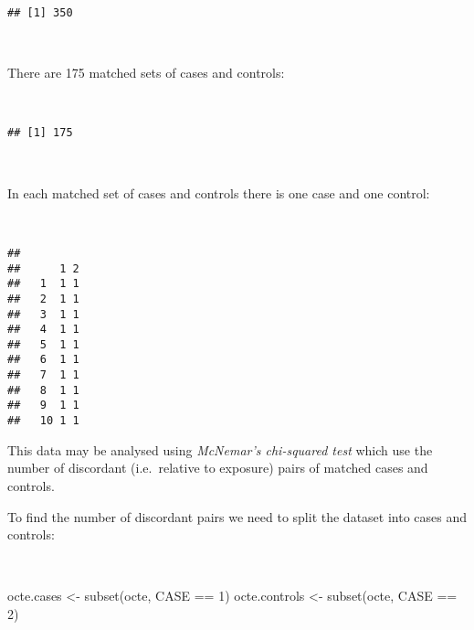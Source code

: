 \documentclass[
  12pt,
  a4paper]{book}
\newenvironment{Shaded}{\begin{snugshade}}{\end{snugshade}}
\newcommand{\DecValTok}[1]{\textcolor[rgb]{0.00,0.00,0.81}{#1}}
\newcommand{\FunctionTok}[1]{\textcolor[rgb]{0.00,0.00,0.00}{#1}}
\newcommand{\NormalTok}[1]{#1}
\newcommand{\OtherTok}[1]{\textcolor[rgb]{0.56,0.35,0.01}{#1}}
\newcommand{\SpecialCharTok}[1]{\textcolor[rgb]{0.00,0.00,0.00}{#1}}
\begin{document}
\begin{verbatim}
## [1] 350
\end{verbatim}

~

There are 175 matched sets of cases and controls:

~

\begin{Shaded}
\end{Shaded}

\begin{verbatim}
## [1] 175
\end{verbatim}

~

In each matched set of cases and controls there is one case and one control:

~

\begin{Shaded}
\end{Shaded}

\begin{verbatim}
##     
##      1 2
##   1  1 1
##   2  1 1
##   3  1 1
##   4  1 1
##   5  1 1
##   6  1 1
##   7  1 1
##   8  1 1
##   9  1 1
##   10 1 1
\end{verbatim}

\newpage

This data may be analysed using \emph{McNemar's chi-squared test} which use the number of discordant (i.e.~relative to exposure) pairs of matched cases and controls.

To find the number of discordant pairs we need to split the dataset into cases and controls:

~

\begin{Shaded}
\begin{Highlighting}[]
\NormalTok{octe.cases }\OtherTok{\textless{}{-}} \FunctionTok{subset}\NormalTok{(octe, CASE }\SpecialCharTok{==} \DecValTok{1}\NormalTok{)}
\NormalTok{octe.controls }\OtherTok{\textless{}{-}} \FunctionTok{subset}\NormalTok{(octe, CASE }\SpecialCharTok{==} \DecValTok{2}\NormalTok{)}
\end{Highlighting}
\end{Shaded}
\end{document}
